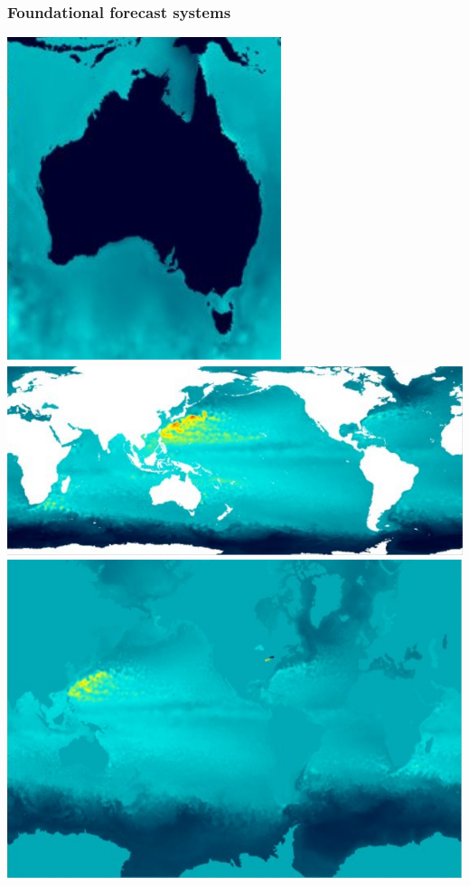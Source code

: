 \begin{frame}
\frametitle{Foundational forecast systems}      
    \includegraphics[height=0.4\textheight]{figures/maps/ocean_ROMS.png} 
    \includegraphics[height=0.4\textheight]{figures/maps/ocean_oceanmaps.png}
    \includegraphics[height=0.4\textheight]{figures/maps/ocean_accesss.png}
\end{frame}

